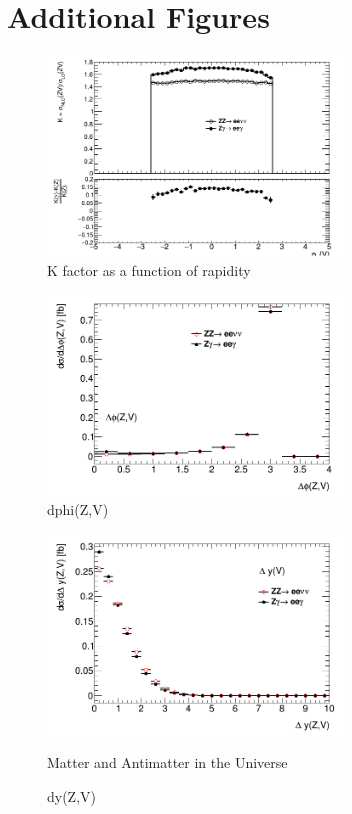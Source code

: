 \documentclass[12pt,a4paper,openright,twoside]{report}
\begin{document}
\chapter{Additional Figures}
\begin{figure}[H]
\centering
	\includegraphics[width=0.7\textwidth]{K_y.png}
	\caption{K factor as a function of rapidity}
	\label{fig:K_y}
\end{figure}
\begin{figure}[H]
\centering
	\includegraphics[width=0.7\textwidth]{dphi.png}
	\caption{dphi(Z,V)}
	\label{fig:dphi}
\end{figure}
\begin{figure}[H]
\centering
	\includegraphics[width=0.7\textwidth]{dy.png}
	\caption{dy(Z,V)}Matter and Antimatter in the Universe
\end{figure}
\end{document}
